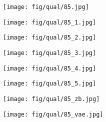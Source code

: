 \documentclass[10pt,twocolumn,letterpaper]{article}
\newcommand{\sze}{0.13}
\newcommand{\szle}{0.08}
\begin{document}
\begin{figure*}[h]
\center

\begin{subfigure}[c]{\sze\linewidth}
\texttt{[image: fig/qual/85.jpg]}
\end{subfigure}
\begin{subfigure}[c]{\sze\linewidth}
\texttt{[image: fig/qual/85\_1.jpg]}
\end{subfigure}
\begin{subfigure}[c]{\sze\linewidth}
\texttt{[image: fig/qual/85\_2.jpg]}
\end{subfigure}
\begin{subfigure}[c]{\sze\linewidth}
\texttt{[image: fig/qual/85\_3.jpg]}
\end{subfigure}
\begin{subfigure}[c]{\sze\linewidth}
\texttt{[image: fig/qual/85\_4.jpg]}
\end{subfigure}
\hspace{3pt}
\begin{subfigure}[c]{\sze\linewidth}
\texttt{[image: fig/qual/85\_5.jpg]}
\end{subfigure}
\begin{subfigure}[c]{\szle\linewidth}
\texttt{[image: fig/qual/85\_zb.jpg]}
\end{subfigure}
\hspace{3pt}
\begin{subfigure}[c]{\szle\linewidth}
\texttt{[image: fig/qual/85\_vae.jpg]}
\end{subfigure}


\end{figure*}
\end{document}
